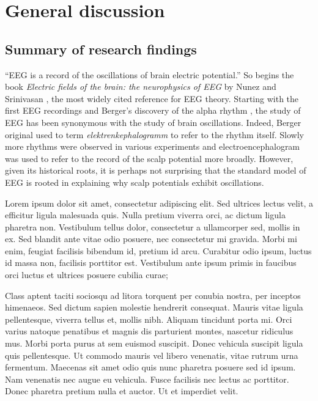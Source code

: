 \chapter{General discussion}
\label{sec:conclusion}

\section{Summary of research findings}


``EEG is a record of the oscillations of brain electric potential.'' So begins the book \textit{Electric fields of the brain: the neurophysics of EEG} by Nunez and Srinivasan \cite{Nunez2006}, the most widely cited reference for EEG theory. Starting with the first EEG recordings and Berger’s discovery of the alpha rhythm \cite{Berger1929}, the study of EEG has been synonymous with the study of brain oscillations. Indeed, Berger original used to term \textit{elektrenkephalogramm} to refer to the rhythm itself. Slowly more rhythms were observed in various experiments and electroencephalogram was used to refer to the record of the scalp potential more broadly. However, given its historical roots, it is perhaps not surprising that the standard model of EEG is rooted in explaining why scalp potentials exhibit oscillations.


Lorem ipsum dolor sit amet, consectetur adipiscing elit. Sed ultrices lectus velit, a efficitur ligula malesuada quis. Nulla pretium viverra orci, ac dictum ligula pharetra non. Vestibulum tellus dolor, consectetur a ullamcorper sed, mollis in ex. Sed blandit ante vitae odio posuere, nec consectetur mi gravida. Morbi mi enim, feugiat facilisis bibendum id, pretium id arcu. Curabitur odio ipsum, luctus id massa non, facilisis porttitor est. Vestibulum ante ipsum primis in faucibus orci luctus et ultrices posuere cubilia curae;

Class aptent taciti sociosqu ad litora torquent per conubia nostra, per inceptos himenaeos. Sed dictum sapien molestie hendrerit consequat. Mauris vitae ligula pellentesque, viverra tellus et, mollis nibh. Aliquam tincidunt porta mi. Orci varius natoque penatibus et magnis dis parturient montes, nascetur ridiculus mus. Morbi porta purus at sem euismod suscipit. Donec vehicula suscipit ligula quis pellentesque. Ut commodo mauris vel libero venenatis, vitae rutrum urna fermentum. Maecenas sit amet odio quis nunc pharetra posuere sed id ipsum. Nam venenatis nec augue eu vehicula. Fusce facilisis nec lectus ac porttitor. Donec pharetra pretium nulla et auctor. Ut et imperdiet velit.

